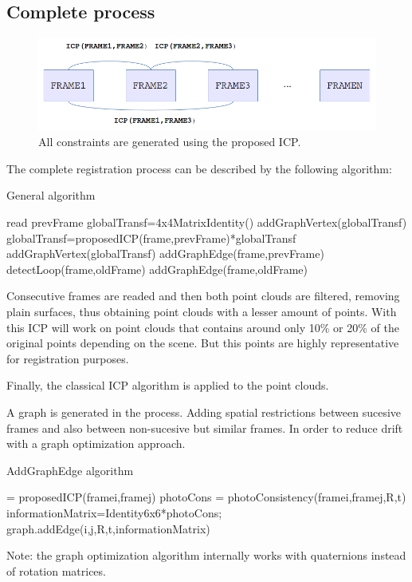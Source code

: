 \subsection{Complete process}

\begin{figure}[!h]
\begin{center}
\includegraphics[scale=0.55]{images/graph_icp}
\caption{All constraints are generated using the proposed ICP.}
\end{center}
\end{figure}


The complete registration process can be described by the following algorithm:

\begin{algorithm}
\caption{General algorithm}
\begin{algorithmic}[1]
\State read prevFrame
\State globalTransf=4x4MatrixIdentity()
\State addGraphVertex(globalTransf)
\State globalTransf=proposedICP(frame,prevFrame)*globalTransf
\State addGraphVertex(globalTransf)
\State addGraphEdge(frame,prevFrame)
\State detectLoop(frame,oldFrame)
\State addGraphEdge(frame,oldFrame)
\EndIf
\EndFor
\EndWhile
\end{algorithmic}
\end{algorithm}

Consecutive frames are readed and then both point clouds are filtered, removing plain surfaces, thus obtaining point clouds 
with a lesser amount of points. With this ICP will work on point clouds that contains around 
only 10\% or 20\% of the original points depending on the scene. But this points are highly representative for registration purposes.

Finally, the classical ICP algorithm is applied to the point clouds.

A graph is generated in the process. Adding spatial restrictions between sucesive frames and also between non-sucesive but similar 
frames. In order to reduce drift with a graph optimization approach.

\begin{algorithm}
\caption{AddGraphEdge algorithm}
\begin{algorithmic}[1]
\State [R,t] = proposedICP(framei,framej)
\State photoCons = photoConsistency(framei,framej,R,t)
\State informationMatrix=Identity6x6*photoCons;
\State graph.addEdge(i,j,R,t,informationMatrix)
\end{algorithmic}
\end{algorithm}

Note: the graph optimization algorithm internally works with quaternions instead of rotation matrices.



 






